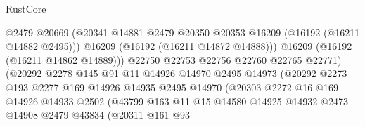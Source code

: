 \begin{lexlean}{RustCore}
\begin{coremodule}
                                      @2479
                                      @20669
                                      (@20341
                                        @14881
                                        @2479
                                        @20350
                                        @20353
                                        @16209
                                        (@16192 (@16211 @14882 @2495)))
                                      @16209
                                      (@16192 (@16211 @14872 @14888)))
                                    @16209
                                    (@16192 (@16211 @14862 @14889)))
                                  @22750
                                  @22753
                                  @22756
                                  @22760
                                  @22765
                                  @22771)
                                (@20292
                                  @2278
                                  @145
                                  @91
                                  @11
                                  @14926
                                  @14970
                                  @2495
                                  @14973
                                  (@20292
                                    @2273
                                    @193
                                    @2277
                                    @169
                                    @14926
                                    @14935
                                    @2495
                                    @14970
                                    (@20303
                                      @2272
                                      @16
                                      @169
                                      @14926
                                      @14933
                                      @2502
                                      (@43799
                                        @163
                                        @11
                                        @15
                                        @14580
                                        @14925
                                        @14932
                                        @2473
                                        @14908
                                        @2479
                                        @43834
                                        (@20311
                                          @161
                                          @93

\end{coremodule}
\end{lexlean}
